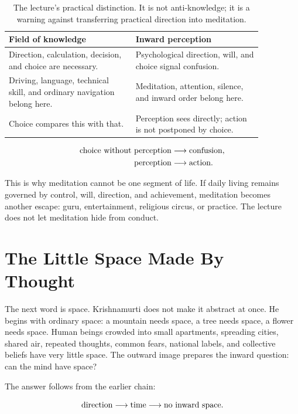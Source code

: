 \documentclass[11pt,oneside]{book}
\begin{document}
\begin{table}
\centering
\begin{tabular}{p{0.43\linewidth}p{0.43\linewidth}}
\hline
\textbf{Field of knowledge} & \textbf{Inward perception} \\
\hline
Direction, calculation, decision, and choice are necessary. & Psychological direction, will, and choice signal confusion. \\
Driving, language, technical skill, and ordinary navigation belong here. & Meditation, attention, silence, and inward order belong here. \\
Choice compares this with that. & Perception sees directly; action is not postponed by choice. \\
\hline
\end{tabular}
\caption{The lecture's practical distinction. It is not anti-knowledge; it is a warning against transferring practical direction into meditation.}
\end{table}

\begin{align}
\hbox{choice without perception}
&\longrightarrow
\hbox{confusion},\\
\hbox{perception}
&\longrightarrow
\hbox{action}.
\end{align}

This is why meditation cannot be one segment of life. If daily living remains governed by control, will, direction, and achievement, meditation becomes another escape: guru, entertainment, religious circus, or practice. The lecture does not let meditation hide from conduct.

\section{The Little Space Made By Thought}

The next word is space. Krishnamurti does not make it abstract at once. He begins with ordinary space: a mountain needs space, a tree needs space, a flower needs space. Human beings crowded into small apartments, spreading cities, shared air, repeated thoughts, common fears, national labels, and collective beliefs have very little space. The outward image prepares the inward question: can the mind have space?

The answer follows from the earlier chain:

\begin{equation}
\hbox{direction}
\longrightarrow
\hbox{time}
\longrightarrow
\hbox{no inward space}.
\end{equation}
\end{document}
